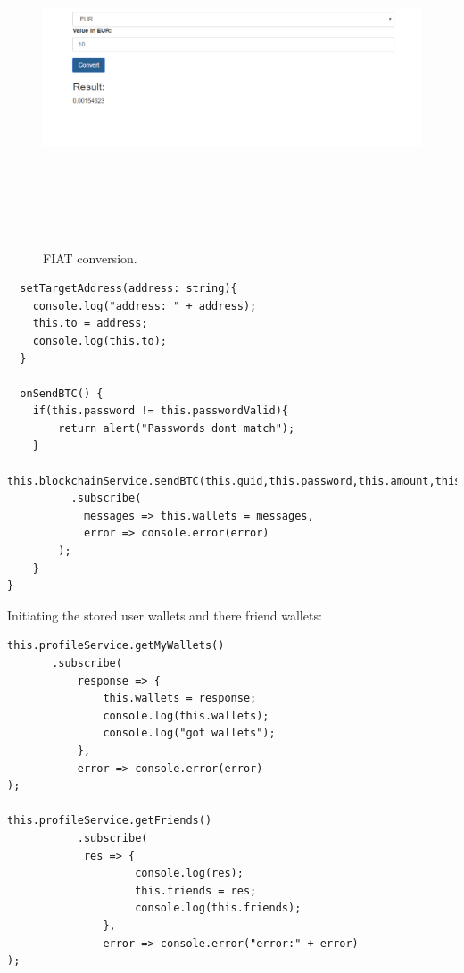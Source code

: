 \begin{figure}[H]
\centering
\includegraphics[width=16cm, height=10cm]{img/fiat.png}
\caption{FIAT conversion.}
\end{figure}

\begin{lstlisting}
  setTargetAddress(address: string){
    console.log("address: " + address);
    this.to = address;
    console.log(this.to);
  }

  onSendBTC() {
    if(this.password != this.passwordValid){
        return alert("Passwords dont match");
    }
    this.blockchainService.sendBTC(this.guid,this.password,this.amount,this.to)
          .subscribe(
            messages => this.wallets = messages,
            error => console.error(error)
        );
    }
}
\end{lstlisting}

Initiating the stored user wallets and there friend wallets:
\begin{lstlisting}
this.profileService.getMyWallets()
       .subscribe(
           response => {
               this.wallets = response;
               console.log(this.wallets);
               console.log("got wallets");
           },
           error => console.error(error)
);

this.profileService.getFriends()
           .subscribe(
            res => {
                    console.log(res);
                    this.friends = res;
                    console.log(this.friends);
               },
               error => console.error("error:" + error)
);
\end{lstlisting}

